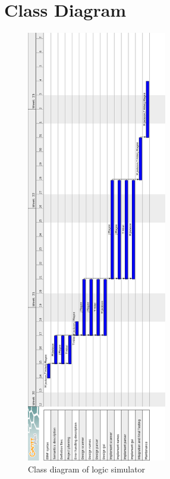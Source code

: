 \documentclass[a4paper,10pt]{article}
\begin{document}
\section{Class Diagram}
\begin{figure}[h]
 \centering
  \includegraphics[height=19cm]{Gantt-Chart.png} %
 \caption{Class diagram of logic simulator}
 \label{fig:classdiagram}
\end{figure}


\clearpage
\end{document}
